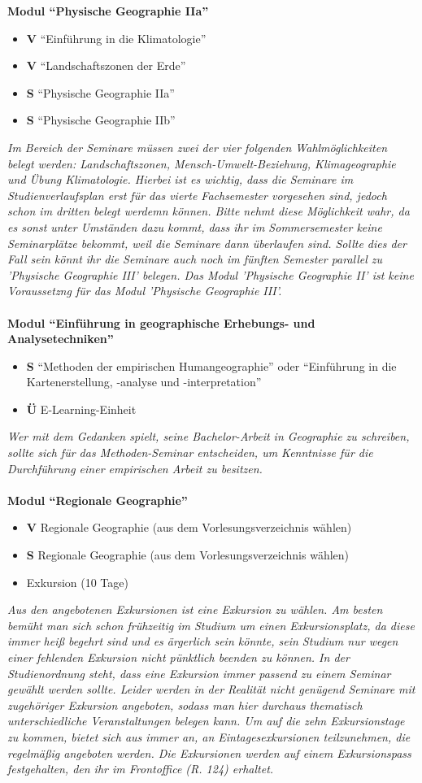 \textbf{Modul "`Physische Geographie IIa"'}
	\begin{itemize}
		\item \textbf{V} "`Einführung in die Klimatologie"'
		\item \textbf{V} "`Landschaftszonen der Erde"'
		\item \textbf{S} "`Physische Geographie IIa"'
		\item \textbf{S} "`Physische Geographie IIb"'
	\end{itemize}	

\emph{Im Bereich der Seminare müssen zwei der vier folgenden Wahlmöglichkeiten belegt werden: Landschaftszonen, Mensch-Umwelt-Beziehung, Klimageographie und Übung Klimatologie. Hierbei ist es wichtig, dass die Seminare im Studienverlaufsplan erst für das vierte Fachsemester vorgesehen sind, jedoch schon im dritten belegt werdemn können. Bitte nehmt diese Möglichkeit wahr, da es sonst unter Umständen dazu kommt, dass ihr im Sommersemester keine Seminarplätze bekommt, weil die Seminare dann überlaufen sind. Sollte dies der Fall sein könnt ihr die Seminare auch noch im fünften Semester parallel zu 'Physische Geographie III' belegen. Das Modul 'Physische Geographie II' ist keine Voraussetzng für das Modul 'Physische Geographie III'.}\\\\
\textbf{Modul "`Einführung in geographische Erhebungs- und Analysetechniken"'}
	\begin{itemize}
		\item \textbf{S} "`Methoden der empirischen Humangeographie"' oder "`Einführung in die Kartenerstellung, -analyse und -interpretation"'
		\item \textbf{Ü} E-Learning-Einheit
	\end{itemize}
\emph{Wer mit dem Gedanken spielt, seine Bachelor-Arbeit in Geographie zu schreiben, sollte sich für das Methoden-Seminar entscheiden, um Kenntnisse für die Durchführung einer empirischen Arbeit zu besitzen.}\\\\
\textbf{Modul "`Regionale Geographie"'}
	\begin{itemize}
		\item \textbf{V} Regionale Geographie (aus dem Vorlesungsverzeichnis wählen)
		\item \textbf{S} Regionale Geographie (aus dem Vorlesungsverzeichnis wählen)
		\item Exkursion (10 Tage)
	\end{itemize}
\emph{Aus den angebotenen Exkursionen ist eine Exkursion zu wählen. Am besten bemüht man sich schon frühzeitig im Studium um einen Exkursionsplatz, da diese immer heiß begehrt sind und es ärgerlich sein könnte, sein Studium nur wegen einer fehlenden Exkursion nicht pünktlich beenden zu können. In der Studienordnung steht, dass eine Exkursion immer passend zu einem Seminar gewählt werden sollte. Leider werden in der Realität nicht genügend Seminare mit zugehöriger Exkursion angeboten, sodass man hier durchaus thematisch unterschiedliche Veranstaltungen belegen kann. Um auf die zehn Exkursionstage zu kommen, bietet sich aus immer an, an Eintagesexkursionen teilzunehmen, die regelmäßig angeboten werden. Die Exkursionen werden auf einem Exkursionspass festgehalten, den ihr im Frontoffice (R. 124) erhaltet.}

